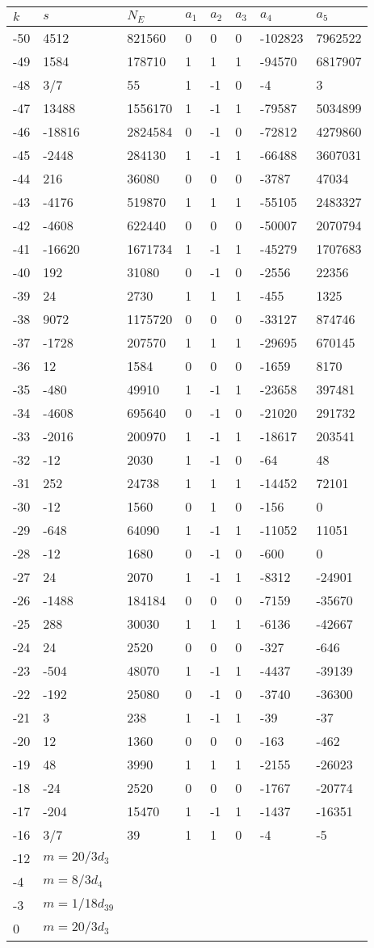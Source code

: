 \documentclass{amsart}
\begin{document}
\begin{longtable}{|l|l|l|lllll|}
\hline
$k$ & $s$ & $N_E$ & $a_1$ & $a_2$ & $a_3$ & $a_4$ & $a_5$\\
\hline
-50&4512&821560&0&0&0&-102823&7962522\\
-49&1584&178710&1&1&1&-94570&6817907\\
-48&3/7&55&1&-1&0&-4&3\\
-47&13488&1556170&1&-1&1&-79587&5034899\\
-46&-18816&2824584&0&-1&0&-72812&4279860\\
-45&-2448&284130&1&-1&1&-66488&3607031\\
-44&216&36080&0&0&0&-3787&47034\\
-43&-4176&519870&1&1&1&-55105&2483327\\
-42&-4608&622440&0&0&0&-50007&2070794\\
-41&-16620&1671734&1&-1&1&-45279&1707683\\
-40&192&31080&0&-1&0&-2556&22356\\
-39&24&2730&1&1&1&-455&1325\\
-38&9072&1175720&0&0&0&-33127&874746\\
-37&-1728&207570&1&1&1&-29695&670145\\
-36&12&1584&0&0&0&-1659&8170\\
-35&-480&49910&1&-1&1&-23658&397481\\
-34&-4608&695640&0&-1&0&-21020&291732\\
-33&-2016&200970&1&-1&1&-18617&203541\\
-32&-12&2030&1&-1&0&-64&48\\
-31&252&24738&1&1&1&-14452&72101\\
-30&-12&1560&0&1&0&-156&0\\
-29&-648&64090&1&-1&1&-11052&11051\\
-28&-12&1680&0&-1&0&-600&0\\
-27&24&2070&1&-1&1&-8312&-24901\\
-26&-1488&184184&0&0&0&-7159&-35670\\
-25&288&30030&1&1&1&-6136&-42667\\
-24&24&2520&0&0&0&-327&-646\\
-23&-504&48070&1&-1&1&-4437&-39139\\
-22&-192&25080&0&-1&0&-3740&-36300\\
-21&3&238&1&-1&1&-39&-37\\
-20&12&1360&0&0&0&-163&-462\\
-19&48&3990&1&1&1&-2155&-26023\\
-18&-24&2520&0&0&0&-1767&-20774\\
-17&-204&15470&1&-1&1&-1437&-16351\\
-16&3/7&39&1&1&0&-4&-5\\
-12&$m=20/3d_{3}$&&\multicolumn{5}{c|}{}\\
-4&$m=8/3d_{4}$&&\multicolumn{5}{c|}{}\\
-3&$m=1/18d_{39}$&&\multicolumn{5}{c|}{}\\
0&$m=20/3d_{3}$&&\multicolumn{5}{c|}{}\\
\hline
\end{longtable}
\end{document}
